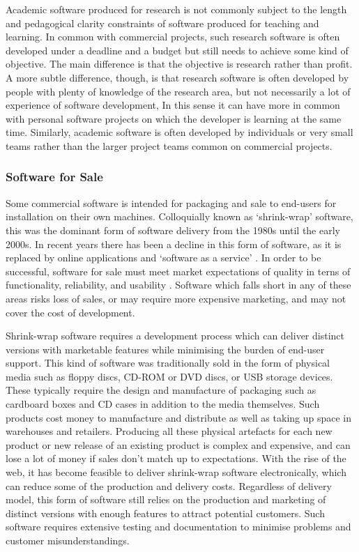 Academic software produced for research is not commonly subject to the length and pedagogical clarity constraints of software produced for teaching and learning. In common with commercial projects, such research software is often developed under a deadline and a budget but still needs to achieve some kind of objective. The main difference is that the objective is research rather than profit. A more subtle difference, though, is that research software is often developed by people with plenty of knowledge of the research area, but not necessarily a lot of experience of software development, In this sense it can have more in common with personal software projects on which the developer is learning at the same time. Similarly, academic software is often developed by individuals or very small teams rather than the larger project teams common on commercial projects.

\subsubsection{Software for Sale}

Some commercial software is intended for packaging and sale to end-users for installation on their own machines. Colloquially known as `shrink-wrap' software, this was the dominant form of software delivery from the 1980s until the early 2000s. In recent years there has been a decline in this form of software, as it is replaced by online applications and `software as a service' \citep{Fan2009}. In order to be successful, software for sale must meet market expectations of quality in terns of functionality, reliability, and usability \citep{Khoshgoftaar2001}. Software which falls short in any of these areas risks loss of sales, or may require more expensive marketing, and may not cover the cost of development.

Shrink-wrap software requires a development process which can deliver distinct versions with marketable features while minimising the burden of end-user support. This kind of software was traditionally sold in the form of physical media such as floppy discs, CD-ROM or DVD discs, or USB storage devices. These typically require the design and manufacture of packaging such as cardboard boxes and CD cases in addition to the media themselves. Such products cost money to manufacture and distribute as well as taking up space in warehouses and retailers. Producing all these physical artefacts for each new product or new release of an existing product is complex and expensive, and can lose a lot of money if sales don't match up to expectations. With the rise of the web, it has become feasible to deliver shrink-wrap software electronically, which can reduce some of the production and delivery costs. Regardless of delivery model, this form of software still relies on the production and marketing of distinct versions with enough features to attract potential customers. Such software requires extensive testing and documentation to minimise problems and customer misunderstandings.

